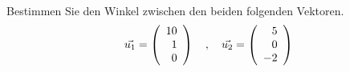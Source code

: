 \begin{aufgabe} ~ \\ 
Bestimmen Sie den Winkel zwischen den beiden folgenden Vektoren.\[\vec{u_1}=\left(\begin{array}{r} 10 \\ 1 \\ 0 \end{array}\right) \quad,\quad \vec{u_2}=\left(\begin{array}{r} 5 \\ 0 \\ -2 \end{array}\right)\]\end{aufgabe} 

